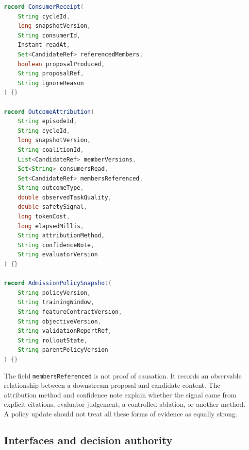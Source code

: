 \begin{lstlisting}[language=Java,caption={Proposed consumer receipt and outcome-attribution records.},label={lst:ch14-feedback-records}]
record ConsumerReceipt(
    String cycleId,
    long snapshotVersion,
    String consumerId,
    Instant readAt,
    Set<CandidateRef> referencedMembers,
    boolean proposalProduced,
    String proposalRef,
    String ignoreReason
) {}

record OutcomeAttribution(
    String episodeId,
    String cycleId,
    long snapshotVersion,
    String coalitionId,
    List<CandidateRef> memberVersions,
    Set<String> consumersRead,
    Set<CandidateRef> membersReferenced,
    String outcomeType,
    double observedTaskQuality,
    double safetySignal,
    long tokenCost,
    long elapsedMillis,
    String attributionMethod,
    String confidenceNote,
    String evaluatorVersion
) {}

record AdmissionPolicySnapshot(
    String policyVersion,
    String trainingWindow,
    String featureContractVersion,
    String objectiveVersion,
    String validationReportRef,
    String rolloutState,
    String parentPolicyVersion
) {}
\end{lstlisting}

The field \texttt{membersReferenced} is not proof of causation. It records an observable relationship between a downstream proposal and candidate content. The attribution method and confidence note explain whether the signal came from explicit citations, evaluator judgement, a controlled ablation, or another method. A policy update should not treat all these forms of evidence as equally strong.

\subsection{Interfaces and decision authority}

